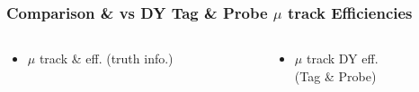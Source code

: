 \documentclass{beamer}
\begin{document}
\begin{frame}
 \frametitle{Comparison \ttbar \& \wpj vs DY Tag \& Probe $\mu$ track Efficiencies}
   \begin{columns}

   \begin{column}{0.33\textwidth}
     \begin{itemize}
   \item $\mu$ track \ttbar \& \wpj eff. (truth info.)
  \end{itemize}
   \end{column}
   \begin{column}{0.33\textwidth}
   \begin{itemize}
    \item $\mu$ track DY eff. \\(Tag \& Probe)
   \end{itemize}


\end{column}
\end{columns}
\end{frame}
\end{document}
